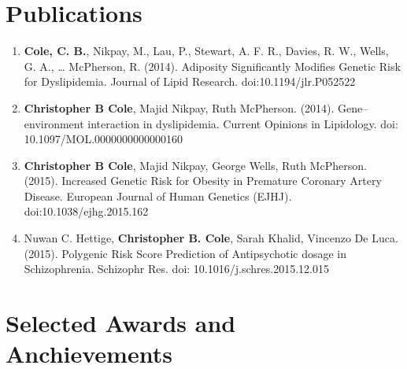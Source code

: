 \documentclass[11pt,a4paper,sans]{moderncv}        %
\begin{document}
\vspace{5pt}

\section{Publications} %
\label{sec:publications}

\vspace{6pt}

\begin{enumerate}
	\item \textbf{Cole, C. B.}, Nikpay, M., Lau, P., Stewart, A. F. R., Davies, R. W., Wells, G. A., … McPherson, R. (2014). Adiposity Significantly Modifies Genetic Risk for Dyslipidemia. Journal of Lipid Research. doi:10.1194/jlr.P052522

	\item \textbf{Christopher B Cole}, Majid Nikpay, Ruth McPherson. (2014). Gene–environment interaction in dyslipidemia. Current Opinions in Lipidology. doi: 10.1097/MOL.0000000000000160


	\item \textbf{Christopher B Cole}, Majid Nikpay, George Wells, Ruth McPherson. (2015). Increased Genetic Risk for Obesity in Premature Coronary Artery Disease. European Journal of Human Genetics (EJHJ). doi:10.1038/ejhg.2015.162

	\item Nuwan C. Hettige, \textbf{Christopher B. Cole}, Sarah Khalid, Vincenzo De Luca. (2015). Polygenic Risk Score Prediction of Antipsychotic dosage in Schizophrenia. Schizophr Res. doi: 10.1016/j.schres.2015.12.015

\end{enumerate}



\section{Selected Awards and Anchievements} %
\label{sec:published_abstracts_&_non_refereed_publications}
\end{document}
